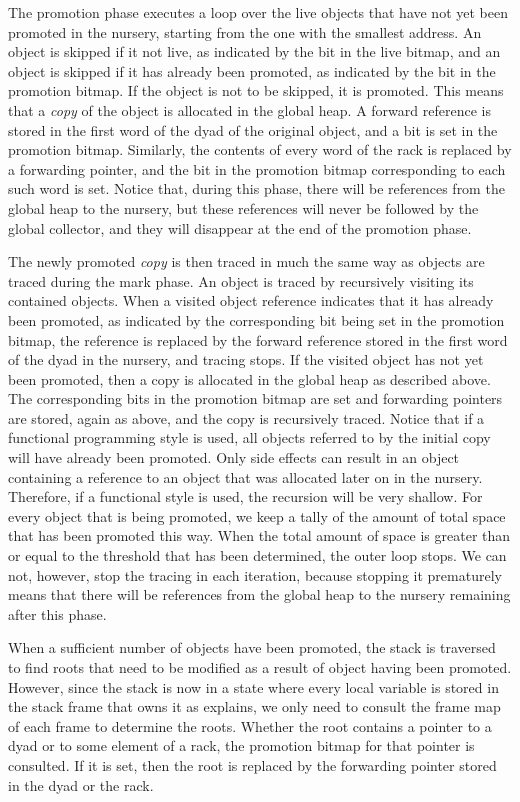 The promotion phase executes a loop over the live objects that have
not yet been promoted in the nursery, starting from the one with the
smallest address.  An object is skipped if it not live, as indicated
by the bit in the live bitmap, and an object is skipped if it has
already been promoted, as indicated by the bit in the promotion
bitmap.  If the object is not to be skipped, it is promoted.  This
means that a \emph{copy} of the object is allocated in the global
heap.  A forward reference is stored in the first word of the dyad
of the original object, and a bit is set in the promotion bitmap.
Similarly, the contents of every word of the rack is replaced by a
forwarding pointer, and the bit in the promotion bitmap corresponding
to each such word is set.  Notice that, during this phase, there will
be references from the global heap to the nursery, but these
references will never be followed by the global collector, and they
will disappear at the end of the promotion phase.

The newly promoted \emph{copy} is then traced in much the same way as
objects are traced during the mark phase.  An object is traced by
recursively visiting its contained objects.  When a visited object
reference indicates that it has already been promoted, as indicated by
the corresponding bit being set in the promotion bitmap, the reference
is replaced by the forward reference stored in the first word of the
dyad in the nursery, and tracing stops.  If the visited object has
not yet been promoted, then a copy is allocated in the global heap as
described above.  The corresponding bits in the promotion bitmap are set
and forwarding pointers are stored, again as above, and the copy is
recursively traced.  Notice that if a functional programming style is
used, all objects referred to by the initial copy will have already
been promoted.  Only side effects can result in an object containing a
reference to an object that was allocated later on in the nursery.
Therefore, if a functional style is used, the recursion will be very
shallow.  For every object that is being promoted, we keep a tally of
the amount of total space that has been promoted this way.  When the
total amount of space is greater than or equal to the threshold that
has been determined, the outer loop stops.  We can not, however, stop
the tracing in each iteration, because stopping it prematurely means
that there will be references from the global heap to the nursery
remaining after this phase.

When a sufficient number of objects have been promoted, the stack is
traversed to find roots that need to be modified as a result of object
having been promoted.  However, since the stack is now in a state
where every local variable is stored in the stack frame that owns it
as  explains, we only
need to consult the frame map of each frame to determine the roots.
Whether the root contains a pointer to a dyad or to some element of
a rack, the promotion bitmap for that pointer is consulted.  If it
is set, then the root is replaced by the forwarding pointer stored in
the dyad or the rack.

